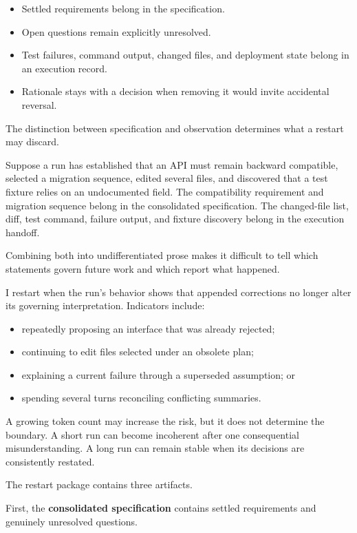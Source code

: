 \begin{itemize}
\tightlist
\item
  Settled requirements belong in the specification.
\item
  Open questions remain explicitly unresolved.
\item
  Test failures, command output, changed files, and deployment state belong in an execution record.
\item
  Rationale stays with a decision when removing it would invite accidental reversal.
\end{itemize}

The distinction between specification and observation determines what a restart may discard.

Suppose a run has established that an API must remain backward compatible, selected a migration sequence, edited several files, and discovered that a test fixture relies on an undocumented field. The compatibility requirement and migration sequence belong in the consolidated specification. The changed-file list, diff, test command, failure output, and fixture discovery belong in the execution handoff.

Combining both into undifferentiated prose makes it difficult to tell which statements govern future work and which report what happened.

I restart when the run's behavior shows that appended corrections no longer alter its governing interpretation. Indicators include:

\begin{itemize}
\tightlist
\item
  repeatedly proposing an interface that was already rejected;
\item
  continuing to edit files selected under an obsolete plan;
\item
  explaining a current failure through a superseded assumption; or
\item
  spending several turns reconciling conflicting summaries.
\end{itemize}

A growing token count may increase the risk, but it does not determine the boundary. A short run can become incoherent after one consequential misunderstanding. A long run can remain stable when its decisions are consistently restated.

The restart package contains three artifacts.

First, the \textbf{consolidated specification} contains settled requirements and genuinely unresolved questions.

